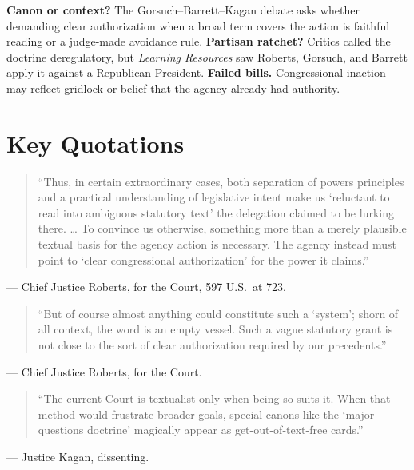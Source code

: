 \documentclass[12pt]{article}
\begin{document}
\textbf{Canon or context?} The Gorsuch--Barrett--Kagan debate asks whether demanding clear authorization when a broad term covers the action is faithful reading or a judge-made avoidance rule. \textbf{Partisan ratchet?} Critics called the doctrine deregulatory, but \textit{Learning Resources} saw Roberts, Gorsuch, and Barrett apply it against a Republican President. \textbf{Failed bills.} Congressional inaction may reflect gridlock or belief that the agency already had authority.

\section{Key Quotations}

\begin{quote}
``Thus, in certain extraordinary cases, both separation of powers principles and a practical understanding of legislative intent make us `reluctant to read into ambiguous statutory text' the delegation claimed to be lurking there. \dots{} To convince us otherwise, something more than a merely plausible textual basis for the agency action is necessary. The agency instead must point to `clear congressional authorization' for the power it claims.''
\end{quote}
\noindent --- Chief Justice Roberts, for the Court, 597 U.S.\ at 723.

\begin{quote}
``But of course almost anything could constitute such a `system'; shorn of all context, the word is an empty vessel. Such a vague statutory grant is not close to the sort of clear authorization required by our precedents.''
\end{quote}
\noindent --- Chief Justice Roberts, for the Court.

\begin{quote}
``The current Court is textualist only when being so suits it. When that method would frustrate broader goals, special canons like the `major questions doctrine' magically appear as get-out-of-text-free cards.''
\end{quote}
\noindent --- Justice Kagan, dissenting.
\end{document}
